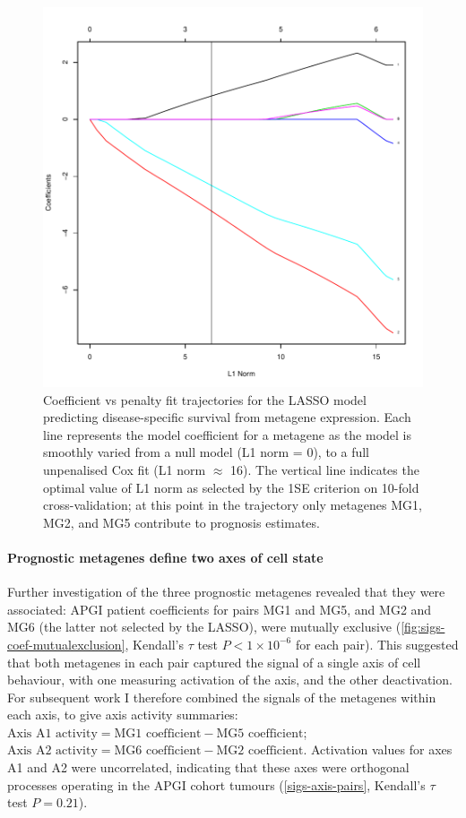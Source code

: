 \documentclass[dissertation.tex]{subfiles}
\begin{document}
\begin{figure}
\centering
\includegraphics[width=.7\linewidth]{analysis/biosurv/reports/18_SIS_diag_dsd_final/figure/nmf-metagene-glmnet-plots-2}
\caption{Coefficient vs penalty fit trajectories for the \acrshort{LASSO} model predicting disease-specific survival from metagene expression.  Each line represents the model coefficient for a metagene as the model is smoothly varied from a null model (L1 norm = 0), to a full unpenalised Cox fit (L1 norm $\approx$ 16).  The vertical line indicates the optimal value of L1 norm as selected by the 1SE criterion on 10-fold cross-validation; at this point in the trajectory only metagenes MG1, MG2, and MG5 contribute to prognosis estimates.\label{fig:sigs-resub-lasso-track}}
\end{figure}

\paragraph{Prognostic metagenes define two axes of cell state}
Further investigation of the three prognostic metagenes revealed that they were associated: \gls{APGI} patient coefficients for pairs MG1 and MG5, and MG2 and MG6 (the latter not selected by the \gls{LASSO}), were mutually exclusive (\cref{fig:sigs-coef-mutualexclusion}, Kendall's $\tau$ test $P < 1 \times 10^{-6}$ for each pair).  This suggested that both metagenes in each pair captured the signal of a single axis of cell behaviour, with one measuring activation of the axis, and the other deactivation.  For subsequent work I therefore combined the signals of the metagenes within each axis, to give axis activity summaries: $\text{Axis A1 activity} = \text{MG1 coefficient} - \text{MG5 coefficient}$; $\text{Axis A2 activity} = \text{MG6 coefficient} - \text{MG2 coefficient}$.  Activation values for axes A1 and A2 were uncorrelated, indicating that these axes were orthogonal processes operating in the \gls{APGI} cohort tumours (\cref{sigs-axis-pairs}, Kendall's $\tau$ test $P = 0.21$).
\end{document}
